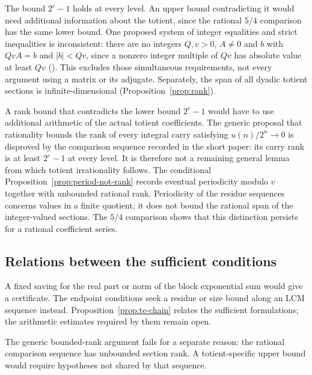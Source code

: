 \begin{rem}
The bound $2^e-1$ holds at every level. An upper bound contradicting it
would need additional information about the totient, since the rational
$5/4$ comparison has the same lower bound. One proposed system of integer
equalities and strict inequalities is inconsistent: there are no integers
$Q,v>0$, $A\ne0$ and $b$ with $QvA=b$ and $|b|<Qv$, since a nonzero
integer multiple of $Qv$ has absolute value at least $Qv$
().
This excludes those simultaneous
requirements, not every argument using a matrix or its adjugate.
Separately, the span of all dyadic totient sections is
infinite-dimensional (Proposition~\ref{prop:rank}).
\end{rem}

\begin{prop}\label{prop:additional-hypothesis-totient-specific-rank}
A rank bound that contradicts the lower bound $2^e-1$ would have to use
additional arithmetic of the actual totient coefficients. The generic
proposal that rationality bounds the rank of every integral carry
satisfying $u(n)/2^n\to0$ is disproved by the comparison sequence
recorded in the short paper:
its carry rank is at least $2^e-1$ at every level. It is therefore not a
remaining general lemma from which totient irrationality follows.
The conditional Proposition~\ref{prop:period-not-rank}
records eventual periodicity modulo $v$ together with unbounded rational
rank. Periodicity of the residue sequences concerns values in a finite
quotient; it does not bound the rational span of the integer-valued
sections. The $5/4$ comparison shows that this distinction persists for
a rational coefficient series.
\end{prop}

\subsection{Relations between the sufficient conditions}

A fixed saving for the real part or norm of the block exponential
sum would give a certificate. The endpoint conditions seek a residue
or size bound along an LCM sequence instead.
Proposition~\ref{prop:te-chain} relates the sufficient formulations;
the arithmetic estimates required by them remain open.

The generic bounded-rank argument fails for a separate reason: the rational
comparison sequence has unbounded section rank. A totient-specific upper
bound would require hypotheses not shared by that sequence.

